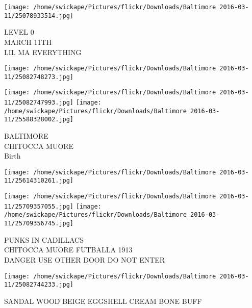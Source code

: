 \documentclass[10pt,letterpaper]{article}
\begin{document}
\vspace{0.25in}
\texttt{[image: /home/swickape/Pictures/flickr/Downloads/Baltimore 2016-03-11/25078933514.jpg]}

LEVEL 0\\
MARCH 11TH\\
LIL MA EVERYTHING\\
\pagebreak

\texttt{[image: /home/swickape/Pictures/flickr/Downloads/Baltimore 2016-03-11/25082748273.jpg]}

\vspace{0.25in}
\texttt{[image: /home/swickape/Pictures/flickr/Downloads/Baltimore 2016-03-11/25082747993.jpg]}
\texttt{[image: /home/swickape/Pictures/flickr/Downloads/Baltimore 2016-03-11/25588328002.jpg]}

BALTIMORE\\
CHITOCCA MUORE\\
Birth\\
\pagebreak

\texttt{[image: /home/swickape/Pictures/flickr/Downloads/Baltimore 2016-03-11/25614310261.jpg]}

\vspace{0.25in}
\texttt{[image: /home/swickape/Pictures/flickr/Downloads/Baltimore 2016-03-11/25709357055.jpg]}
\texttt{[image: /home/swickape/Pictures/flickr/Downloads/Baltimore 2016-03-11/25709356745.jpg]}

PUNKS IN CADILLACS\\
CHITOCCA MUORE FUTBALLA 1913\\
DANGER USE OTHER DOOR DO NOT ENTER\\
\pagebreak

\texttt{[image: /home/swickape/Pictures/flickr/Downloads/Baltimore 2016-03-11/25082744233.jpg]}

SANDAL WOOD BEIGE EGGSHELL CREAM BONE BUFF\\
\pagebreak
\end{document}
